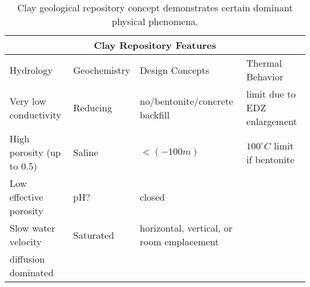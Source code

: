%
\begin{table}[h!]
  \centering
  \footnotesize{
  \begin{tabular}{|l|l|l|l|}
    \multicolumn{4}{c}{\textbf{Clay Repository Features}}\\
    \hline
     Hydrology & Geochemistry & Design Concepts & Thermal Behavior \\ 
    \hline
    Very low conductivity&Reducing&no/bentonite/concrete backfill &limit due to EDZ enlargement\\
    High porosity (up to 0.5)&Saline&$<(-100m)$&$100^\circ C$ limit if bentonite\\
    Low effective porosity&pH?&closed&\\
    Slow water velocity &Saturated&horizontal, vertical, or room emplacement&\\
    diffusion dominated &&&\\
    \hline
  \end{tabular}
  \caption[Clay Repository Features]{Clay geological repository 
  concept demonstrates certain dominant physical phenomena. }
  \label{tab:clay_tab}
  }
\end{table}


